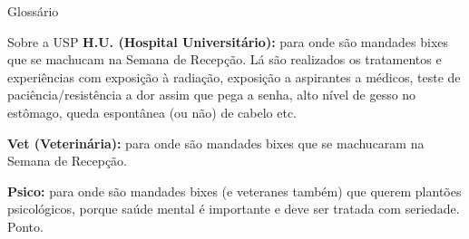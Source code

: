 \begin{secao}{Glossário}
\begin{subsecao}{Sobre a USP}
{\bf H.U. (Hospital Universitário):} para onde são mandades bixes que se
machucam na Semana de Recepção. Lá são realizados os tratamentos e experiências
com exposição à radiação, exposição a aspirantes a médicos, teste de
paciência/resistência a dor assim que pega a senha, alto nível de gesso no
estômago, queda espontânea (ou não) de cabelo etc.

{\bf Vet (Veterinária):} para onde são mandades bixes que se machucaram na
Semana de Recepção.

{\bf Psico:} para onde são mandades bixes (e veteranes também) que querem
plantões psicológicos, porque saúde mental é importante e deve ser tratada com
seriedade. Ponto.

\end{subsecao}
\end{secao}
